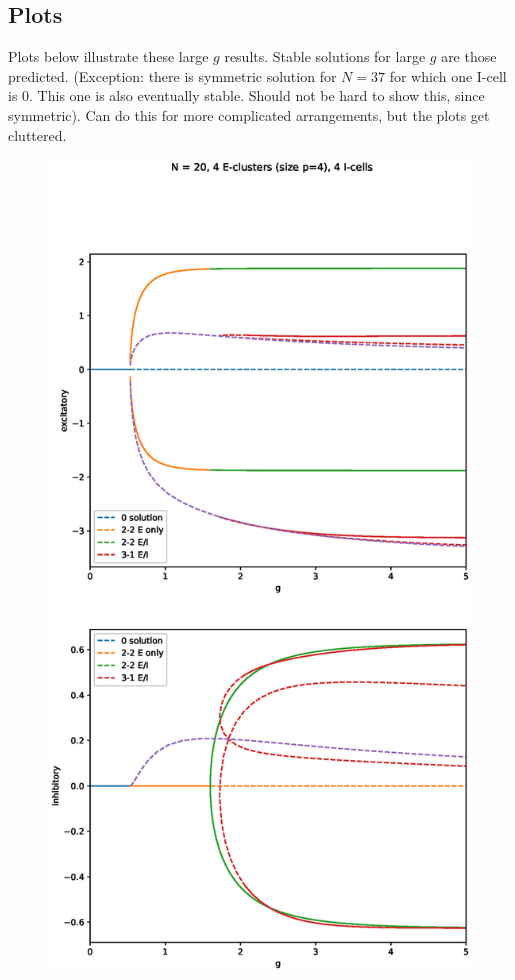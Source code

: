 \documentclass[11pt,reqno]{amsart}
\begin{document}
\subsection{Plots}

Plots below illustrate these large $g$ results. Stable solutions for large $g$ are those predicted. (Exception: there is symmetric solution for $N=37$ for which one I-cell is 0. This one is also eventually stable. Should not be hard to show this, since symmetric). Can do this for more complicated arrangements, but the plots get cluttered.

\begin{figure}[H]
\centering
\includegraphics[width=14cm]{images/bifdiagc4p4i4.eps}
\end{figure}
\end{document}

